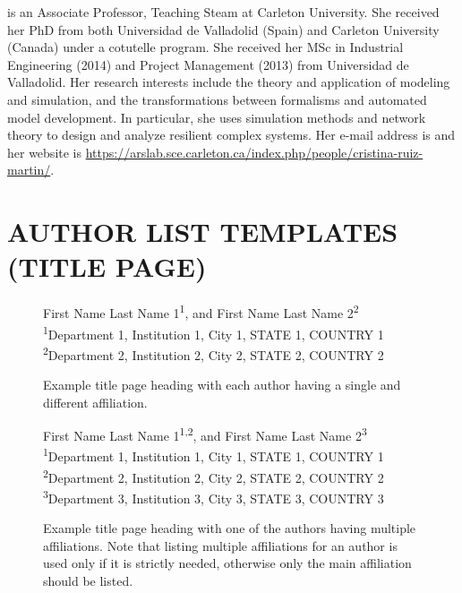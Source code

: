 \documentclass{wscpaperproc}
\theoremstyle{wsc}
\begin{document}
 is an Associate Professor, Teaching Steam at Carleton University. She received her PhD from both Universidad de Valladolid (Spain) and Carleton University (Canada) under a cotutelle program. She received her MSc in Industrial Engineering (2014) and Project Management (2013) from Universidad de Valladolid. Her research interests include the theory and application of modeling and simulation, and the transformations between formalisms and automated model development. In particular, she uses simulation methods and network theory to design and analyze resilient complex systems. Her e-mail address is  and her website is \url{https://arslab.sce.carleton.ca/index.php/people/cristina-ruiz-martin/}.\\


\newpage

\section*{AUTHOR LIST TEMPLATES (TITLE PAGE)}

\vspace{11pt}

\begin{figure}[!htb]
\begin{center}
		First Name Last Name 1\textsuperscript{1}, and First Name Last Name 2\textsuperscript{2}\\[11pt]		
		\textsuperscript{1}Department 1, Institution 1, City 1, STATE 1, COUNTRY 1\\
		\textsuperscript{2}Department 2, Institution 2, City 2, STATE 2, COUNTRY 2
        \end{center}
        \caption{Example title page heading with each author having a single and different affiliation.}  \label{fig:different}
\end{figure}

\vspace{22pt}

\begin{figure}[!htb]
\begin{center}
		First Name Last Name 1\textsuperscript{1,2}, and First Name Last Name 2\textsuperscript{3}\\[11pt]
		\textsuperscript{1}Department 1, Institution 1, City 1, STATE 1, COUNTRY 1\\
		\textsuperscript{2}Department 2, Institution 2, City 2, STATE 2, COUNTRY 2\\
        \textsuperscript{3}Department 3, Institution 3, City 3, STATE 3, COUNTRY 3 
        \end{center}
        \caption{Example title page heading with one of the authors having multiple affiliations. Note that listing multiple affiliations for an author is used only if it is strictly needed, otherwise only the main affiliation should be listed.} \label{fig:multiple}
\end{figure}
\end{document}
